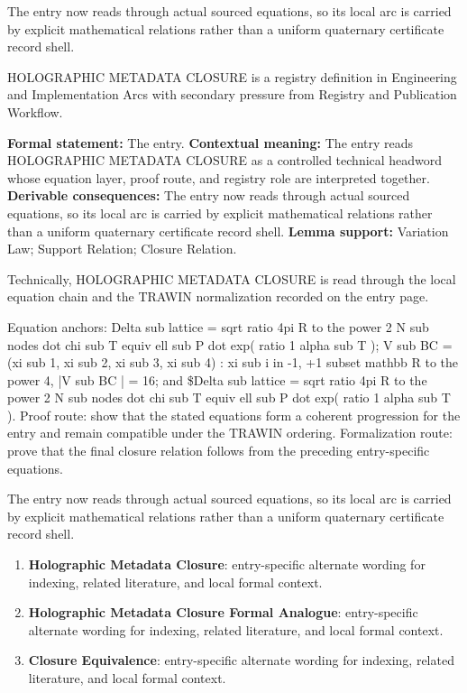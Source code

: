 The entry now reads through actual sourced equations, so its local arc is carried by explicit mathematical relations rather than a uniform quaternary certificate record shell.
\clearpage


\begingroup\small
{}
HOLOGRAPHIC METADATA CLOSURE is a registry definition in Engineering and Implementation Arcs with secondary pressure from Registry and Publication Workflow.

\begingroup\footnotesize\setlength{\emergencystretch}{3em}\sloppy
\textbf{Formal statement:} The entry. \textbf{Contextual meaning:} The entry reads HOLOGRAPHIC METADATA CLOSURE as a controlled technical headword whose equation layer, proof route, and registry role are interpreted together. \textbf{Derivable consequences:} The entry now reads through actual sourced equations, so its local arc is carried by explicit mathematical relations rather than a uniform quaternary certificate record shell. \textbf{Lemma support:} Variation Law; Support Relation; Closure Relation.\par
\endgroup

Technically, HOLOGRAPHIC METADATA CLOSURE is read through the local equation chain and the TRAWIN normalization recorded on the entry page.

Equation anchors: Delta sub lattice = sqrt ratio 4pi R to the power 2 N sub nodes dot chi sub T equiv ell sub P dot exp( ratio 1 alpha sub T ); V sub BC = (xi sub 1, xi sub 2, xi sub 3, xi sub 4) : xi sub i in -1, +1 subset mathbb R to the power 4, |V sub BC | = 16; and \$Delta sub lattice = sqrt ratio 4pi R to the power 2 N sub nodes dot chi sub T equiv ell sub P dot exp( ratio 1 alpha sub T ). Proof route: show that the stated equations form a coherent progression for the entry and remain compatible under the TRAWIN ordering. Formalization route: prove that the final closure relation follows from the preceding entry-specific equations.

The entry now reads through actual sourced equations, so its local arc is carried by explicit mathematical relations rather than a uniform quaternary certificate record shell.
\endgroup

\begin{enumerate}[leftmargin=1.6em,itemsep=6pt,topsep=4pt]
\item \textbf{Holographic Metadata Closure}: entry-specific alternate wording for indexing, related literature, and local formal context.
\item \textbf{Holographic Metadata Closure Formal Analogue}: entry-specific alternate wording for indexing, related literature, and local formal context.
\item \textbf{Closure Equivalence}: entry-specific alternate wording for indexing, related literature, and local formal context.
\end{enumerate}

